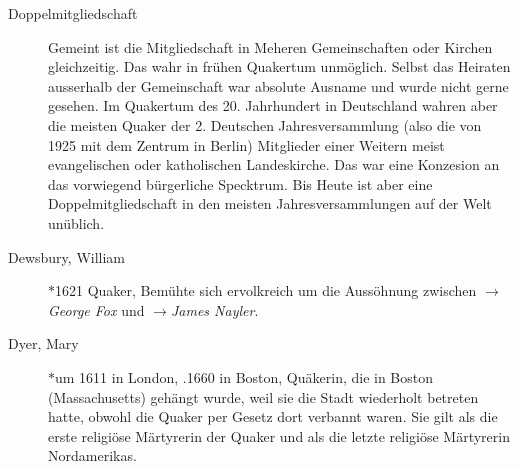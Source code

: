\begin{description}
 \item[Doppelmitgliedschaft] Gemeint ist die Mitgliedschaft in Meheren Gemeinschaften
 oder Kirchen gleichzeitig. Das wahr in frühen Quakertum unmöglich. Selbst das
 Heiraten
 ausserhalb der Gemeinschaft war absolute Ausname und wurde nicht gerne gesehen. Im
 Quakertum des 20. Jahrhundert in Deutschland wahren aber die meisten Quaker der 2.
 Deutschen Jahresversammlung (also die von 1925 mit dem Zentrum in Berlin) Mitglieder
 einer Weitern meist evangelischen oder katholischen Landeskirche. Das war eine
 Konzesion an das vorwiegend bürgerliche Specktrum. Bis Heute ist aber eine
 Doppelmitgliedschaft in den meisten Jahresversammlungen auf der Welt unüblich.

 \item[Dewsbury, William] $\ast$1621  Quaker, Bemühte sich ervolkreich um
 die Aussöhnung zwischen $\to$\textit{George Fox} und $\to$\textit{James Nayler}.

 \item[Dyer, Mary] $\ast$um 1611 in London, .1660 in Boston, Quäkerin, die in
 Boston (Massachusetts) gehängt wurde, weil sie die Stadt wiederholt betreten hatte,
 obwohl die Quaker per Gesetz dort verbannt waren. Sie gilt als die erste religiöse
 Märtyrerin der Quaker und als die letzte religiöse Märtyrerin Nordamerikas.

 \end{description}

\normalsize